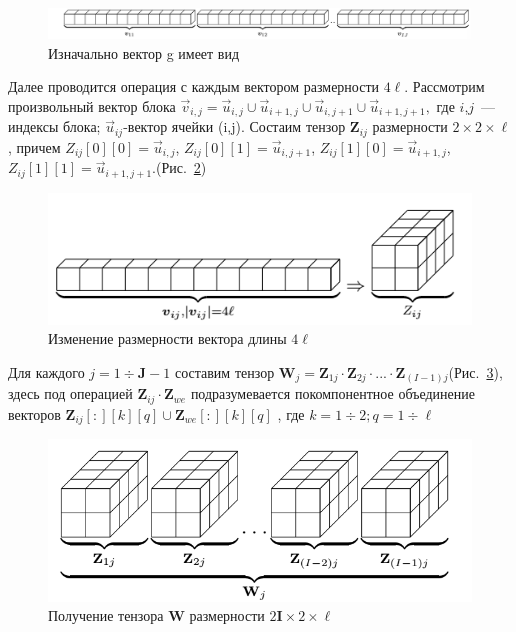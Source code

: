 \documentclass[12pt,twoside]{article}
\begin{document}
\begin{center}

\begin{figure}[H]
	\includegraphics[width=\linewidth]{1}
	\caption{Изначально вектор g имеет вид}
	\label{ris:1}
\end{figure}
\end{center}
Далее проводится операция с каждым вектором размерности $4 \ell$. Рассмотрим произвольный вектор блока $\vec{v}_{i,j} = \vec{u}_{i,j}\cup\vec{u}_{i+1,j}\cup\vec{u}_{i,j+1}
	\cup\vec{u}_{i+1,j+1},$ где $i$,$j$~--- индексы блока; $\vec{u}_{ij}$-вектор ячейки (i,j). 
Состаим тензор $\textbf{Z}_{ij}$ 
размерности $2\times 2 \times \ell$, 
причем $Z_{ij}[0][0]=\vec{u}_{i,j}$, $Z_{ij}[0][1]=\vec{u}_{i,j+1}$, $Z_{ij}[1][0]=\vec{u}_{i+1,j}$, $Z_{ij}[1][1]=\vec{u}_{i+1,j+1}$.(Рис.~\ref{ris:2})
\begin{center}
\begin{figure}[H]
	\includegraphics[width=0.6\linewidth]{2}
	\caption{Изменение размерности вектора длины $4 \ell$ }
	\label{ris:2}
\end{figure}
\end{center}
Для каждого $j=1\div \textbf{J}-1$ составим тензор $\textbf{W}_j=\textbf{Z}_{1j}\cdot\textbf{Z}_{2j}\cdot ... \cdot \textbf{Z}_{(I-1)j} $(Рис.~\ref{ris:3}), здесь под операцией $\textbf{Z}_{ij} \cdot \textbf{Z}_{we}$ подразумевается покомпонентное объединение векторов $\textbf{Z}_{ij}[:][k][q] \cup \textbf{Z}_{we}[:][k][q]$ , где $k=1\div 2; q=1\div \ell$
\begin{center}
\begin{figure}[H]
	\includegraphics[width=0.7\linewidth]{3}
	\caption{Получение тензора $\textbf{W}$ размерности $2\textbf{I}\times 2 \times \ell$ }
	\label{ris:3}
\end{figure}
\end{center}
\end{document}
